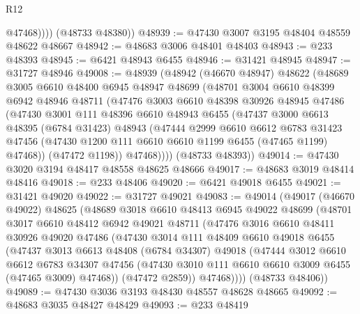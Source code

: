 \begin{lexlean}{R12}
\begin{coremodule}
              @47468))))
      (@48733 @48380))
@48939 := @47430 @3007 @3195 @48404 @48559 @48622 @48667
@48942 := @48683 @3006 @48401 @48403
@48943 := @233 @48393
@48945 := @6421 @48943 @6455
@48946 := @31421 @48945
@48947 := @31727 @48946
@49008 := @48939
    (@48942
      (@46670 @48947)
      @48622
      (@48689
        @3005
        @6610
        @48400
        @6945
        @48947
        @48699
        (@48701
          @3004
          @6610
          @48399
          @6942
          @48946
          @48711
          (@47476
            @3003
            @6610
            @48398
            @30926
            @48945
            @47486
            (@47430
              @3001
              @111
              @48396
              @6610
              @48943
              @6455
              (@47437
                @3000
                @6613
                @48395
                (@6784 @31423)
                @48943
                (@47444
                  @2999
                  @6610
                  @6612
                  @6783
                  @31423
                  @47456
                  (@47430 @1200 @111 @6610 @6610 @1199 @6455 (@47465 @1199) @47468))
                (@47472 @1198))
              @47468))))
      (@48733 @48393))
@49014 := @47430 @3020 @3194 @48417 @48558 @48625 @48666
@49017 := @48683 @3019 @48414 @48416
@49018 := @233 @48406
@49020 := @6421 @49018 @6455
@49021 := @31421 @49020
@49022 := @31727 @49021
@49083 := @49014
    (@49017
      (@46670 @49022)
      @48625
      (@48689
        @3018
        @6610
        @48413
        @6945
        @49022
        @48699
        (@48701
          @3017
          @6610
          @48412
          @6942
          @49021
          @48711
          (@47476
            @3016
            @6610
            @48411
            @30926
            @49020
            @47486
            (@47430
              @3014
              @111
              @48409
              @6610
              @49018
              @6455
              (@47437
                @3013
                @6613
                @48408
                (@6784 @34307)
                @49018
                (@47444
                  @3012
                  @6610
                  @6612
                  @6783
                  @34307
                  @47456
                  (@47430 @3010 @111 @6610 @6610 @3009 @6455 (@47465 @3009) @47468))
                (@47472 @2859))
              @47468))))
      (@48733 @48406))
@49089 := @47430 @3036 @3193 @48430 @48557 @48628 @48665
@49092 := @48683 @3035 @48427 @48429
@49093 := @233 @48419

\end{coremodule}
\end{lexlean}
